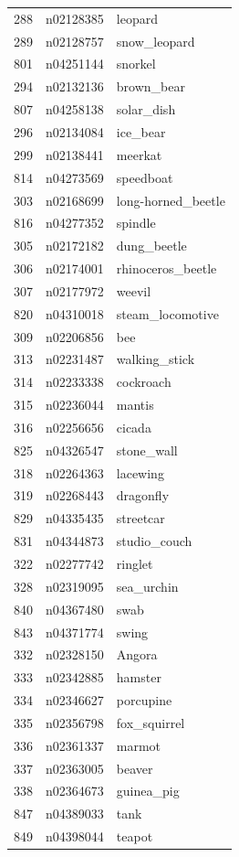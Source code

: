 \begin{table}
\begin{tabular}{cll}
288 & n02128385 & leopard \\
289 & n02128757 & snow_leopard \\
801 & n04251144 & snorkel \\
294 & n02132136 & brown_bear \\
807 & n04258138 & solar_dish \\
296 & n02134084 & ice_bear \\
299 & n02138441 & meerkat \\
814 & n04273569 & speedboat \\
303 & n02168699 & long-horned_beetle \\
816 & n04277352 & spindle \\
305 & n02172182 & dung_beetle \\
306 & n02174001 & rhinoceros_beetle \\
307 & n02177972 & weevil \\
820 & n04310018 & steam_locomotive \\
309 & n02206856 & bee \\
313 & n02231487 & walking_stick \\
314 & n02233338 & cockroach \\
315 & n02236044 & mantis \\
316 & n02256656 & cicada \\
825 & n04326547 & stone_wall \\
318 & n02264363 & lacewing \\
319 & n02268443 & dragonfly \\
829 & n04335435 & streetcar \\
831 & n04344873 & studio_couch \\
322 & n02277742 & ringlet \\
328 & n02319095 & sea_urchin \\
840 & n04367480 & swab \\
843 & n04371774 & swing \\
332 & n02328150 & Angora \\
333 & n02342885 & hamster \\
334 & n02346627 & porcupine \\
335 & n02356798 & fox_squirrel \\
336 & n02361337 & marmot \\
337 & n02363005 & beaver \\
338 & n02364673 & guinea_pig \\
847 & n04389033 & tank \\
849 & n04398044 & teapot \\

\end{tabular}
\end{table}
